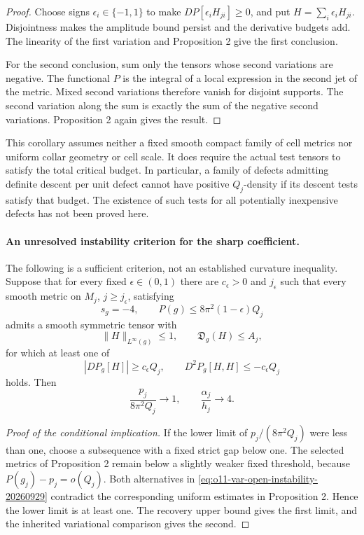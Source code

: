 \begin{proof}
Choose signs $\epsilon_i\in\{-1,1\}$ to make
$DP[\epsilon_iH_{ji}]\ge0$, and put $H=\sum_i\epsilon_iH_{ji}$.
Disjointness makes the amplitude bound persist and the derivative
budgets add. The linearity of the first variation and Proposition 2 give
the first conclusion.

For the second conclusion, sum only the tensors whose second variations
are negative. The functional $P$ is the integral of a local expression
in the second jet of the metric. Mixed second variations therefore
vanish for disjoint supports. The second variation along the sum is
exactly the sum of the negative second variations. Proposition 2 again
gives the result.
\end{proof}

This corollary assumes neither a fixed smooth compact family of cell
metrics nor uniform collar geometry or cell scale. It does require the
actual test tensors to satisfy the total critical budget. In particular,
a family of defects admitting definite descent per unit defect cannot
have positive $Q_j$-density if its descent tests satisfy that budget.
The existence of such tests for all potentially inexpensive defects has
not been proved here.

\paragraph{An unresolved instability criterion for the sharp coefficient.}
The following is a sufficient criterion, not an established curvature
inequality. Suppose that for every fixed $\epsilon\in(0,1)$ there are
$c_\epsilon>0$ and $j_\epsilon$ such that every smooth metric on $M_j$,
$j\ge j_\epsilon$, satisfying
\[
 s_g=-4,\qquad P(g)\le8\pi^2(1-\epsilon)Q_j
\]
admits a smooth symmetric tensor with
\[
 \|H\|_{L^\infty(g)}\le1,\qquad \mathfrak D_g(H)\le A_j,
\]
for which at least one of
\begin{equation}
 |DP_g[H]|\ge c_\epsilon Q_j,
 \qquad
 D^2P_g[H,H]\le-c_\epsilon Q_j
 \label{eq:o11-var-open-instability-20260929}
\end{equation}
holds. Then
\[
 \frac{p_j}{8\pi^2Q_j}\longrightarrow1,
 \qquad \frac{\alpha_j}{h_j}\longrightarrow4.
\]

\begin{proof}[Proof of the conditional implication]
If the lower limit of $p_j/(8\pi^2Q_j)$ were less than one, choose a
subsequence with a fixed strict gap below one. The selected metrics of
Proposition 2 remain below a slightly weaker fixed threshold, because
$P(g_j)-p_j=o(Q_j)$. Both alternatives in
\eqref{eq:o11-var-open-instability-20260929} contradict the corresponding
uniform estimates in Proposition 2. Hence the lower limit is at least
one. The recovery upper bound gives the first limit, and the inherited
variational comparison gives the second.
\end{proof}

